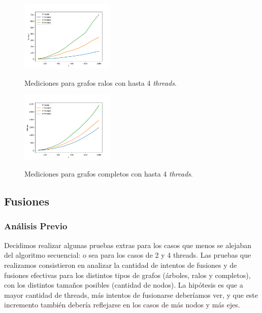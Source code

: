 \begin{figure}[h]
\caption{Mediciones para grafos ralos con hasta 4 \textit{threads}.}
\centering
\includegraphics[width=0.4\textwidth]{imagenes/ralo-124.png} 
\label{fig:ralos124}
\end{figure}

\begin{figure}[h]
\caption{Mediciones para grafos completos con hasta 4 \textit{threads}.}
\centering
\includegraphics[width=0.4\textwidth]{imagenes/completo-124.png} \\
\label{fig:completos124}
\end{figure}

\newpage

\subsection{Fusiones}

\subsubsection{Análisis Previo}

Decidimos realizar algunas pruebas extras para los casos que menos se alejaban 
del algoritmo secuencial: o sea para los casos de 2 y 4 threads. Las pruebas 
que realizamos consistieron en analizar la cantidad de intentos de fusiones y de 
fusiones efectivas para los distintos tipos de grafos (árboles, ralos y 
completos), con los distintos tamaños posibles (cantidad de nodos). La 
hipótesis es que a mayor cantidad de threads, más intentos de fusionarse 
deberíamos ver, y que este incremento también debería reflejarse en los casos 
de más nodos y más ejes.

